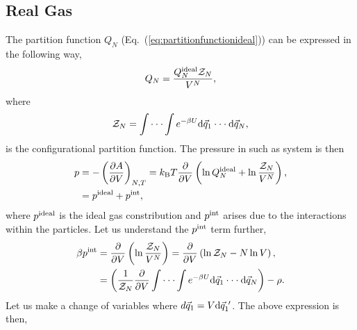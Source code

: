 \documentclass[a4paper]{article}
\begin{document}
\subsection{Real Gas}
The partition function $Q_{N}$ (Eq.~(\ref{eq:partitionfunctionideal})) can be expressed in the following way,
\begin{equation}
Q_{N}=\frac{Q_{N}^{\rm ideal}\mathcal{Z}_{N}}{V^{N}},
\end{equation}
where 
\begin{equation}
\mathcal{Z}_{N}=\int\cdot\cdot\cdot\int e^{-\beta U}{\rm d}\vec{q}_{1}\cdot\cdot\cdot{\rm d}\vec{q}_{N},
\end{equation}
is the configurational partition function. The pressure in such as system is then
\begin{equation}
\begin{split}
p&=-\left(\frac{\partial A}{\partial V}\right)_{N,T}=k_{\rm B}T\frac{\partial}{\partial V}\left(\ln{Q_{N}^{\rm ideal}} + \ln{\frac{\mathcal{Z}_{N}}{V^{N}}}\right),\\
&=p^{\rm ideal}+p^{\rm int},
\end{split}
\end{equation}
where $p^{\rm ideal}$ is the ideal gas constribution and $p^{\rm int}$ arises due to the interactions within the particles. Let us understand the $p^{\rm int}$ term further,
\begin{equation}
\begin{split}
\beta p^{\rm int}&=\frac{\partial}{\partial V}\left(\ln{\frac{\mathcal{Z}_{N}}{V^{N}}}\right)=\frac{\partial}{\partial V}\left(\ln{\mathcal{Z}_{N}}-N\ln{V}\right),\\
&=\left(\frac{1}{\mathcal{Z}_{N}}\frac{\partial}{\partial V}\int\cdot\cdot\cdot\int e^{-\beta U}{\rm d}\vec{q}_{1}\cdot\cdot\cdot{\rm d}\vec{q}_{N}\right)-\rho.
\end{split}
\end{equation}
Let us make a change of variables where ${d}\vec{q}_{1}=V{\rm d}\vec{q}_{1}^{~\prime}$. The above expression is then,
\end{document}
